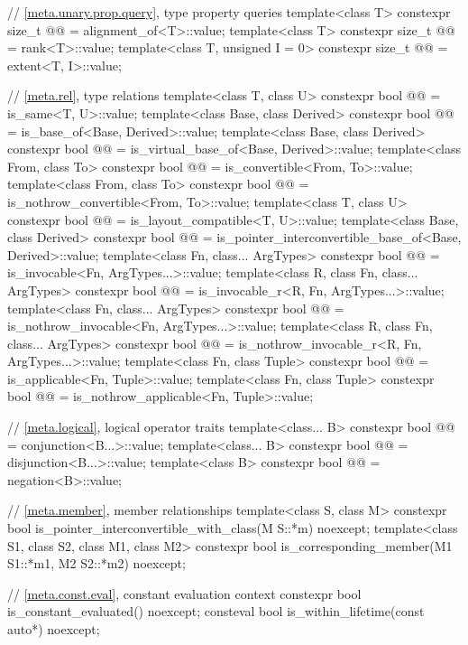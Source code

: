 \begin{codeblock}
{  // \ref{meta.unary.prop.query}, type property queries
  template<class T>
    constexpr size_t @@ = alignment_of<T>::value;
  template<class T>
    constexpr size_t @@ = rank<T>::value;
  template<class T, unsigned I = 0>
    constexpr size_t @@ = extent<T, I>::value;

  // \ref{meta.rel}, type relations
  template<class T, class U>
    constexpr bool @@ = is_same<T, U>::value;
  template<class Base, class Derived>
    constexpr bool @@ = is_base_of<Base, Derived>::value;
  template<class Base, class Derived>
    constexpr bool @@ = is_virtual_base_of<Base, Derived>::value;
  template<class From, class To>
    constexpr bool @@ = is_convertible<From, To>::value;
  template<class From, class To>
    constexpr bool @@ = is_nothrow_convertible<From, To>::value;
  template<class T, class U>
    constexpr bool @@ = is_layout_compatible<T, U>::value;
  template<class Base, class Derived>
    constexpr bool @@
      = is_pointer_interconvertible_base_of<Base, Derived>::value;
  template<class Fn, class... ArgTypes>
    constexpr bool @@ = is_invocable<Fn, ArgTypes...>::value;
  template<class R, class Fn, class... ArgTypes>
    constexpr bool @@ = is_invocable_r<R, Fn, ArgTypes...>::value;
  template<class Fn, class... ArgTypes>
    constexpr bool @@ = is_nothrow_invocable<Fn, ArgTypes...>::value;
  template<class R, class Fn, class... ArgTypes>
    constexpr bool @@ = is_nothrow_invocable_r<R, Fn, ArgTypes...>::value;
  template<class Fn, class Tuple>
    constexpr bool @@ = is_applicable<Fn, Tuple>::value;
  template<class Fn, class Tuple>
    constexpr bool @@ = is_nothrow_applicable<Fn, Tuple>::value;

  // \ref{meta.logical}, logical operator traits
  template<class... B>
    constexpr bool @@ = conjunction<B...>::value;
  template<class... B>
    constexpr bool @@ = disjunction<B...>::value;
  template<class B>
    constexpr bool @@ = negation<B>::value;

  // \ref{meta.member}, member relationships
  template<class S, class M>
    constexpr bool is_pointer_interconvertible_with_class(M S::*m) noexcept;
  template<class S1, class S2, class M1, class M2>
    constexpr bool is_corresponding_member(M1 S1::*m1, M2 S2::*m2) noexcept;

  // \ref{meta.const.eval}, constant evaluation context
  constexpr bool is_constant_evaluated() noexcept;
  consteval bool is_within_lifetime(const auto*) noexcept;
}
\end{codeblock}

